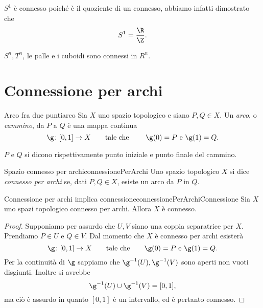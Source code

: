 \begin{ese}
	\(S^1\) è connesso poiché è il quoziente di un connesso, abbiamo infatti dimostrato che
	\[
		S^1 = \frac{\R}{\Z}.
	\]
\end{ese}

\begin{ese}
	\(S^n,T^n\), le palle e i cuboidi sono connessi in \(R^n\).
\end{ese}
\section{Connessione per archi}

\begin{defn}{Arco fra due punti}{arco}
	Sia \(X\) uno spazio topologico e siano \(P,Q\in X\).
	Un \emph{arco}, o \emph{cammino}, da \(P\) a \(Q\) è una mappa continua
	\[
		\g\colon [0,1]\to X \qquad\text{tale che }\qquad \g(0)=P\text{ e }\g(1)=Q.
	\]
\end{defn}

\begin{notz}
	\(P\) e \(Q\) si dicono rispettivamente punto iniziale e punto finale del cammino.
\end{notz}

\begin{defn}{Spazio connesso per archi}{connessionePerArchi}
	Uno spazio topologico \(X\) si dice \emph{connesso per archi} se, dati \(P,Q\in X\), esiste un arco da \(P\) in \(Q\).
\end{defn}

\begin{prop}{Connessione per archi implica connessione}{connessionePerArchiConnessione}
	Sia \(X\) uno spazi topologico connesso per archi.
	Allora \(X\) è connesso.
\end{prop}

\begin{proof}
	Supponiamo per assurdo che \(U,V\) siano una coppia separatrice per \(X\).
	Prendiamo \(P\in U\) e \(Q\in V\). Dal momento che \(X\) è connesso per archi esisterà
	\[
		\g\colon [0,1] \to X \qquad\text{tale che}\qquad \g(0)=P\text{ e }\g(1)=Q.
	\]
	Per la continuità di \(\g\) sappiamo che \(\g^{-1}(U),\g^{-1}(V)\) sono aperti non vuoti disgiunti.
	Inoltre si avrebbe
	\[
		\g^{-1}(U) \cup \g^{-1}(V) = [0,1],
	\]
	ma ciò è assurdo in quanto \([0,1]\) è un intervallo, ed è pertanto connesso.
\end{proof}

